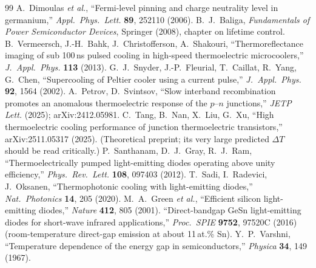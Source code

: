 \documentclass[11pt,a4paper]{article}
\begin{document}
\begin{thebibliography}{99}
 A.~Dimoulas \emph{et al.}, ``Fermi-level pinning and charge neutrality level in germanium,'' \emph{Appl.\ Phys.\ Lett.} \textbf{89}, 252110 (2006).
 B.~J.~Baliga, \emph{Fundamentals of Power Semiconductor Devices}, Springer (2008), chapter on lifetime control.
 B.~Vermeersch, J.-H.~Bahk, J.~Christofferson, A.~Shakouri, ``Thermoreflectance imaging of sub 100\,ns pulsed cooling in high-speed thermoelectric microcoolers,'' \emph{J.\ Appl.\ Phys.} \textbf{113} (2013).
 G.~J.~Snyder, J.-P.~Fleurial, T.~Caillat, R.~Yang, G.~Chen, ``Supercooling of Peltier cooler using a current pulse,'' \emph{J.\ Appl.\ Phys.} \textbf{92}, 1564 (2002).
 A.~Petrov, D.~Svintsov, ``Slow interband recombination promotes an anomalous thermoelectric response of the $p$--$n$ junctions,'' \emph{JETP Lett.} (2025); arXiv:2412.05981.
 C.~Tang, B.~Nan, X.~Liu, G.~Xu, ``High thermoelectric cooling performance of junction thermoelectric transistors,'' arXiv:2511.05317 (2025). (Theoretical preprint; its very large predicted $\Delta T$ should be read critically.)
 P.~Santhanam, D.~J.~Gray, R.~J.~Ram, ``Thermoelectrically pumped light-emitting diodes operating above unity efficiency,'' \emph{Phys.\ Rev.\ Lett.} \textbf{108}, 097403 (2012).
 T.~Sadi, I.~Radevici, J.~Oksanen, ``Thermophotonic cooling with light-emitting diodes,'' \emph{Nat.\ Photonics} \textbf{14}, 205 (2020).
 M.~A.~Green \emph{et al.}, ``Efficient silicon light-emitting diodes,'' \emph{Nature} \textbf{412}, 805 (2001).
 ``Direct-bandgap GeSn light-emitting diodes for short-wave infrared applications,'' \emph{Proc.\ SPIE} \textbf{9752}, 97520C (2016) (room-temperature direct-gap emission at about 11\,at.\% Sn).
 Y.~P.~Varshni, ``Temperature dependence of the energy gap in semiconductors,'' \emph{Physica} \textbf{34}, 149 (1967).
\end{thebibliography}
\end{document}
